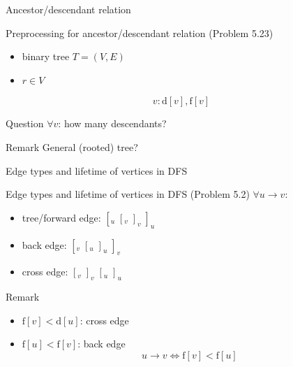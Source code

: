 \begin{frame}{Ancestor/descendant relation}
  \begin{exampleblock}{Preprocessing for ancestor/descendant relation (Problem 5.23)}
    \begin{itemize}
      \item binary tree $T = (V, E)$
      \item $r \in V$
    \end{itemize}
  \end{exampleblock}

  \[
	v: \text{d}[v], \text{f}[v]
  \]

  \pause
  \begin{alertblock}{Question}
    $\forall v$: how many descendants?
  \end{alertblock}

  \pause
  \begin{alertblock}{Remark}
	General (rooted) tree?
  \end{alertblock}
\end{frame}
\begin{frame}{Edge types and lifetime of vertices in DFS}
  \begin{exampleblock}{Edge types and lifetime of vertices in DFS (Problem 5.2)}
    $\forall u \to v$:
    \begin{itemize}
      \item tree/forward edge: $[_{u}\; [_{v}\; ]_{v}\; ]_{u}$
      \item back edge: $[_{v}\; [_{u}\; ]_{u}\; ]_{v}$
      \item cross edge: $[_{v}\; ]_{v}\; [_{u}\; ]_{u}$
    \end{itemize}
  \end{exampleblock}

  \pause

  \begin{alertblock}{Remark}
    \begin{itemize}
      \item $\text{f}[v] < \text{d}[u]$: cross edge
      \item $\text{f}[u] < \text{f}[v]$: back edge
		\pause
		\[
		  u \to v \iff \text{f}[v] < \text{f}[u]
		\]
    \end{itemize}
  \end{alertblock}
\end{frame}
